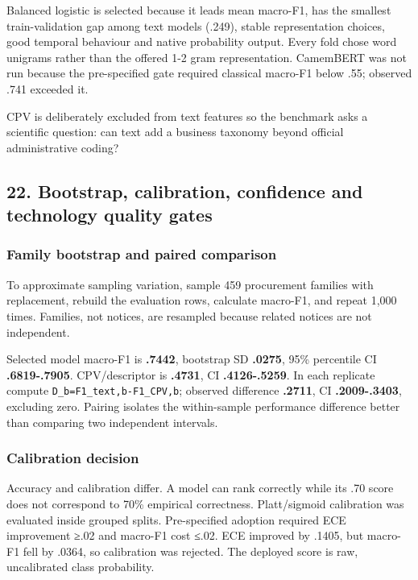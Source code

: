 Balanced logistic is selected because it leads mean macro-F1, has the
smallest train-validation gap among text models (.249), stable
representation choices, good temporal behaviour and native probability
output. Every fold chose word unigrams rather than the offered 1-2 gram
representation. CamemBERT was not run because the pre-specified gate
required classical macro-F1 below .55; observed .741 exceeded it.

CPV is deliberately excluded from text features so the benchmark asks a
scientific question: can text add a business taxonomy beyond official
administrative coding?

\subsection{22. Bootstrap, calibration, confidence and technology
quality
gates}\label{22-bootstrap-calibration-confidence-and-technology-quality-gates}

\subsubsection{Family bootstrap and paired
comparison}\label{family-bootstrap-and-paired-comparison}

To approximate sampling variation, sample 459 procurement families with
replacement, rebuild the evaluation rows, calculate macro-F1, and repeat
1,000 times. Families, not notices, are resampled because related
notices are not independent.

Selected model macro-F1 is \textbf{.7442}, bootstrap SD \textbf{.0275},
95\% percentile CI \textbf{.6819-.7905}. CPV/descriptor is
\textbf{.4731}, CI \textbf{.4126-.5259}. In each replicate compute
\texttt{D\_b=F1\_text,b-F1\_CPV,b}; observed difference \textbf{.2711},
CI \textbf{.2009-.3403}, excluding zero. Pairing isolates the
within-sample performance difference better than comparing two
independent intervals.

\subsubsection{Calibration decision}\label{calibration-decision}

Accuracy and calibration differ. A model can rank correctly while its
.70 score does not correspond to 70\% empirical correctness.
Platt/sigmoid calibration was evaluated inside grouped splits.
Pre-specified adoption required ECE improvement ≥.02 and macro-F1 cost
≤.02. ECE improved by .1405, but macro-F1 fell by .0364, so calibration
was rejected. The deployed score is raw, uncalibrated class probability.

